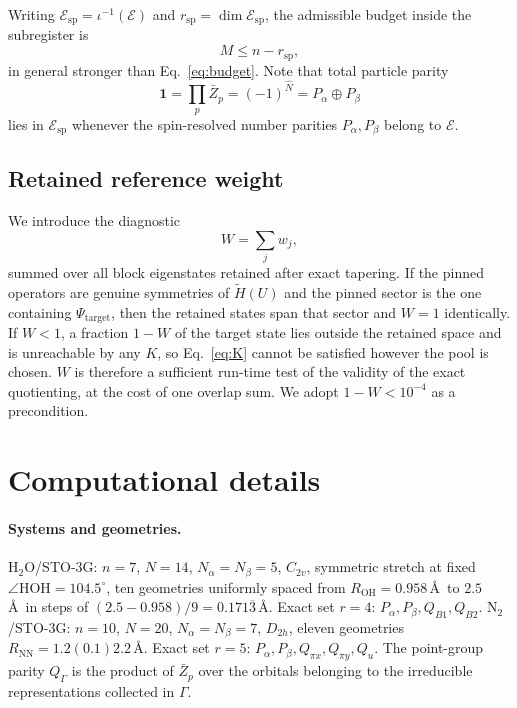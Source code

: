 \documentclass[11pt]{article}
\newcommand{\Ht}{\widetilde H}
\newcommand{\Ecal}{\mathcal E}
\newcommand{\Zb}{\bar Z}
\newcommand{\rsp}{r_{\mathrm{sp}}}
\begin{document}
Writing $\Ecal_{\mathrm{sp}}=\iota^{-1}(\Ecal)$ and
$\rsp=\dim\Ecal_{\mathrm{sp}}$, the admissible budget inside the subregister is
\begin{equation}
M\le n-\rsp ,
\label{eq:budget-sp}
\end{equation}
in general stronger than Eq.~\eqref{eq:budget}. Note that total particle parity
\begin{equation}
\mathbf 1=\prod_{p}\Zb_p=(-1)^{\hat N}=P_\alpha\oplus P_\beta
\label{eq:allones}
\end{equation}
lies in $\Ecal_{\mathrm{sp}}$ whenever the spin-resolved number parities
$P_\alpha,P_\beta$ belong to $\Ecal$.

\subsection{Retained reference weight}
\label{sec:W}

We introduce the diagnostic
\begin{equation}
W=\sum_{j}w_j ,
\label{eq:W}
\end{equation}
summed over all block eigenstates retained after exact tapering. If the pinned
operators are genuine symmetries of $\Ht(U)$ and the pinned sector is the one
containing $\Psi_{\mathrm{target}}$, then the retained states span that sector
and $W=1$ identically. If $W<1$, a fraction $1-W$ of the target state lies
outside the retained space and is unreachable by any $K$, so Eq.~\eqref{eq:K}
cannot be satisfied however the pool is chosen. $W$ is therefore a sufficient
run-time test of the validity of the exact quotienting, at the cost of one
overlap sum. We adopt $1-W<10^{-4}$ as a precondition.

\section{Computational details}
\label{sec:details}

\paragraph{Systems and geometries.}
$\mathrm{H_2O}$/STO-3G: $n=7$, $N=14$, $N_\alpha=N_\beta=5$, $C_{2v}$, symmetric
stretch at fixed $\angle\mathrm{HOH}=104.5^{\circ}$, ten geometries uniformly
spaced from $R_{\mathrm{OH}}=0.958$\,\AA\ to $2.5$\,\AA\ in steps of
$(2.5-0.958)/9=0.171\overline{3}$\,\AA. Exact set $r=4$:
$P_\alpha,P_\beta,Q_{B1},Q_{B2}$.
$\mathrm{N_2}$/STO-3G: $n=10$, $N=20$, $N_\alpha=N_\beta=7$, $D_{2h}$, eleven
geometries $R_{\mathrm{NN}}=1.2(0.1)2.2$\,\AA. Exact set $r=5$:
$P_\alpha,P_\beta,Q_{\pi x},Q_{\pi y},Q_u$. The point-group parity $Q_\Gamma$ is
the product of $\Zb_p$ over the orbitals belonging to the irreducible
representations collected in $\Gamma$.
\end{document}
